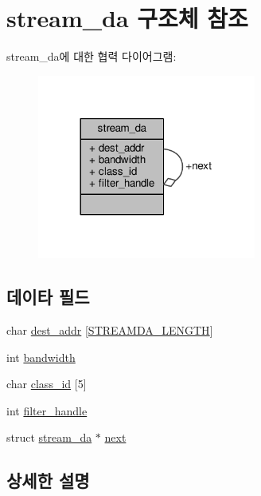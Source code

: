 \hypertarget{structstream__da}{}\section{stream\+\_\+da 구조체 참조}
\label{structstream__da}


stream\+\_\+da에 대한 협력 다이어그램\+:
\nopagebreak
\begin{figure}[H]
\begin{center}
\leavevmode
\includegraphics[width=204pt]{structstream__da__coll__graph}
\end{center}
\end{figure}
\subsection*{데이타 필드}
\begin{DoxyCompactItemize}
\item 
char \hyperlink{structstream__da_a48e2dd031360cb9786e3650c897a3d44}{dest\+\_\+addr} \mbox{[}\hyperlink{openavb__endpoint__osal__shaper_8c_a4d02202f6eb4ba09b3da91b3573043dc}{S\+T\+R\+E\+A\+M\+D\+A\+\_\+\+L\+E\+N\+G\+TH}\mbox{]}
\item 
int \hyperlink{structstream__da_a71b420b9a271ff67fe17d3f93d6a81b1}{bandwidth}
\item 
char \hyperlink{structstream__da_a04a01ac17f2b59581f15f1a4ff5c99d0}{class\+\_\+id} \mbox{[}5\mbox{]}
\item 
int \hyperlink{structstream__da_acfe0fcb6ee8972f5b5bc4b1aca1e8c7a}{filter\+\_\+handle}
\item 
struct \hyperlink{structstream__da}{stream\+\_\+da} $\ast$ \hyperlink{structstream__da_a47d59761a90bc27f0a5135bfdf7c6eab}{next}
\end{DoxyCompactItemize}


\subsection{상세한 설명}


